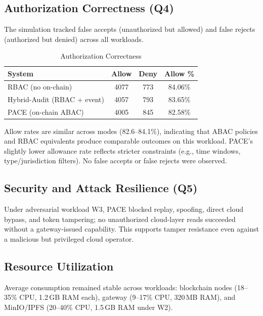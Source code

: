 \documentclass[pdflatex,sn-mathphys-num]{sn-jnl}
\begin{document}
\subsection{Authorization Correctness (Q4)}
The simulation tracked false accepts (unauthorized but allowed) and false
rejects (authorized but denied) across all workloads.
\begin{table}[!htbp]
	\centering
	\caption{Authorization Correctness}
	\begin{tabular}{lccc}
		\toprule
		\textbf{System}             & \textbf{Allow} & \textbf{Deny} & \textbf{Allow \%} \\
		\midrule
		RBAC (no on-chain)          & 4077           & 773           & 84.06\%           \\
		Hybrid-Audit (RBAC + event) & 4057           & 793           & 83.65\%           \\
		PACE (on-chain ABAC)  & 4005           & 845           & 82.58\%           \\
		\bottomrule
	\end{tabular}
	\label{tab:correctness}
\end{table}
Allow rates are similar across modes (82.6--84.1\%), indicating that ABAC policies and RBAC equivalents produce comparable outcomes on this workload. PACE's slightly lower allowance rate reflects stricter constraints (e.g., time windows, type/jurisdiction filters). No false accepts or false rejects were observed.

\subsection{Security and Attack Resilience (Q5)}

Under adversarial workload W3, PACE blocked replay, spoofing, direct cloud bypass, and token tampering; no unauthorized cloud-layer reads succeeded without a gateway-issued capability. This supports tamper resistance even against a malicious but privileged cloud operator.

\subsection{Resource Utilization}
Average consumption remained stable across workloads: blockchain nodes (18--35\% CPU, 1.2\,GB RAM each), gateway (9--17\% CPU, 320\,MB RAM), and MinIO/IPFS (20--40\% CPU, 1.5\,GB RAM under W2).
\end{document}
